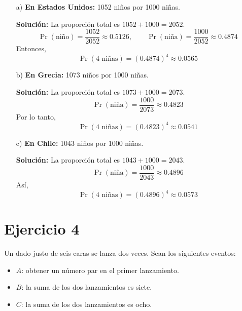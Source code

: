 \documentclass{article}
\begin{document}
\begin{enumerate}
    \item[a)] \textbf{En Estados Unidos:} 1052 niños por 1000 niñas.

    \textbf{Solución:} La proporción total es $1052 + 1000 = 2052$.\\
    
    \[
        \Pr(\text{niño}) = \frac{1052}{2052} \approx 0.5126, \qquad
        \Pr(\text{niña}) = \frac{1000}{2052} \approx 0.4874
    \]
    Entonces,
    \[
        \Pr(\text{4 niñas}) = (0.4874)^4 \approx 0.0565
    \]

    \item[b)] \textbf{En Grecia:} 1073 niños por 1000 niñas.

    \textbf{Solución:} La proporción total es $1073 + 1000 = 2073$.\\
    \[
        \Pr(\text{niña}) = \frac{1000}{2073} \approx 0.4823
    \]
    Por lo tanto,
    \[
        \Pr(\text{4 niñas}) = (0.4823)^4 \approx 0.0541
    \]

    \item[c)] \textbf{En Chile:} 1043 niños por 1000 niñas.

    \textbf{Solución:} La proporción total es $1043 + 1000 = 2043$.\\
    \[
        \Pr(\text{niña}) = \frac{1000}{2043} \approx 0.4896
    \]
    Así,
    \[
        \Pr(\text{4 niñas}) = (0.4896)^4 \approx 0.0573
    \]
\end{enumerate}

\section*{Ejercicio 4}

Un dado justo de seis caras se lanza dos veces.  
Sean los siguientes eventos:
\begin{itemize}
    \item $A$: obtener un número par en el primer lanzamiento.
    \item $B$: la suma de los dos lanzamientos es siete.
    \item $C$: la suma de los dos lanzamientos es ocho.
\end{itemize}
\end{document}
